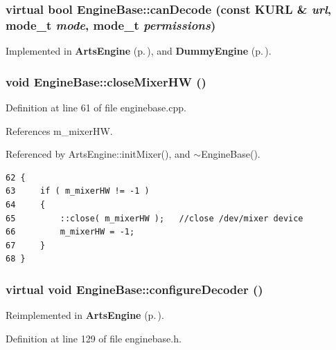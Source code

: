 \subsubsection{\setlength{\rightskip}{0pt plus 5cm}virtual bool Engine\-Base::can\-Decode (const KURL \& {\em url}, mode\_\-t {\em mode}, mode\_\-t {\em permissions})\hspace{0.3cm}{\tt  [pure virtual]}}\label{classEngineBase_EngineBasea4}




Implemented in {\bf Arts\-Engine} {\rm (p.\,\pageref{classArtsEngine_ArtsEnginea4})}, and {\bf Dummy\-Engine} {\rm (p.\,\pageref{classDummyEngine_DummyEngined2})}.
\subsubsection{\setlength{\rightskip}{0pt plus 5cm}void Engine\-Base::close\-Mixer\-HW ()\hspace{0.3cm}{\tt  [protected]}}\label{classEngineBase_EngineBaseb0}




Definition at line 61 of file enginebase.cpp.

References m\_\-mixer\-HW.

Referenced by Arts\-Engine::init\-Mixer(), and $\sim$Engine\-Base().



\footnotesize\begin{verbatim}62 {
63     if ( m_mixerHW != -1 )
64     {
65         ::close( m_mixerHW );   //close /dev/mixer device
66         m_mixerHW = -1;
67     }
68 }
\end{verbatim}\normalsize 
{}
\subsubsection{\setlength{\rightskip}{0pt plus 5cm}virtual void Engine\-Base::configure\-Decoder ()\hspace{0.3cm}{\tt  [inline, virtual, slot]}}\label{classEngineBase_EngineBasei6}




Reimplemented in {\bf Arts\-Engine} {\rm (p.\,\pageref{classArtsEngine_ArtsEnginei6})}.

Definition at line 129 of file enginebase.h.



